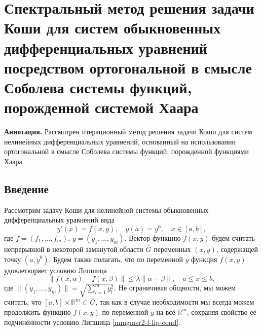 \section{Спектральный метод решения задачи Коши для систем обыкновенных дифференциальных уравнений посредством  ортогональной в смысле Соболева системы функций, порожденной системой Хаара}

\textbf{Аннотация.} Рассмотрен итерационный метод решения задачи Коши для систем нелинейных дифференциальных уравнений, основанный на использовании ортогональной в смысле Соболева системы функций, порожденной функциями Хаара.

\subsection{Введение}
\label{mmgmsr2-intro}

Рассмотрим задачу Коши для нелинейной системы обыкновенных дифференциальных уравнений вида
\begin{equation}\label{mmgmsr2-cauchy-problem}
y'(x)=f(x,y), \quad y(a)=y^0, \quad x \in [a,b],
\end{equation}
где $f=(f_1, \ldots, f_m)$, $y=(y_1, \ldots, y_m)$. %
Вектор-функцию $f(x,y)$ будем считать непрерывной в некоторой замкнутой  области $\bar G$ переменных $(x,y)$, содержащей точку $(a,y^0)$.
Будем также полагать, что по переменной $y$ функция $f(x,y)$ удовлетворяет условию Липшица
\begin{equation}\label{mmgmsr2-f-lip-cond}
\|f(x,\alpha)-f(x,\beta)\|\le \lambda\|\alpha-\beta\|,
\quad a \le x \le b,
\end{equation}
где $\|(y_1,\ldots,y_m)\|=\sqrt{\sum_{l=1}^my_l^2}$.
Не ограничивая общности, мы можем считать, что  $[a,b] \times \mathbb{R}^m \subset \bar G$, так как в случае необходимости мы всегда можем продолжить функцию $f(x,y)$ по переменной $y$ на всё $\mathbb{R}^m$, сохраняя свойство её подчинённости условию Липшица \eqref{mmgmsr2-f-lip-cond}.

